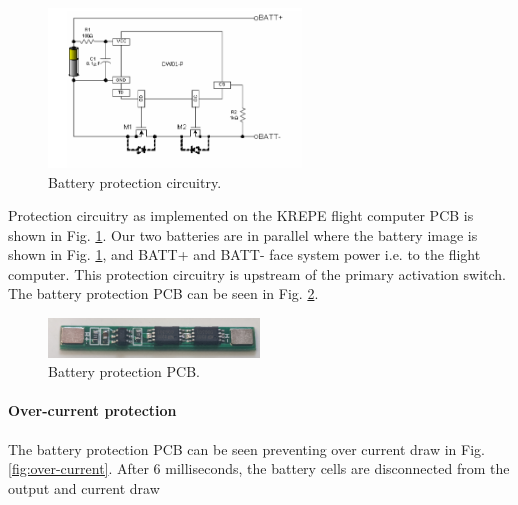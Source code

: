\documentclass{article}
\begin{document}
\begin{figure}[H]
	\centering
	\includegraphics[width=0.6\textwidth]{images/dw108.png}
	\caption{Battery protection circuitry.}
	\label{fig:bat-protec}
\end{figure}



Protection circuitry as implemented on the KREPE flight computer PCB is shown in Fig. \ref{fig:bat-protec}. Our two batteries are in parallel where the battery image is shown in Fig. \ref{fig:bat-protec}, and BATT+ and BATT- face system power i.e. to the flight computer. This protection circuitry is upstream of the primary activation switch. The battery protection PCB can be seen in Fig. \ref{fig:bat-protect}.


\begin{figure}[H]
	\centering
	\includegraphics[width=0.5\textwidth]{images/new_batt_prot.png}
	\caption{Battery protection PCB.}
	\label{fig:bat-protect}
\end{figure}


\paragraph{Over-current protection}
The battery protection PCB can be seen preventing over current draw in Fig. \ref{fig:over-current}. After 6 milliseconds, the battery cells are disconnected from the output and current draw 
\end{document}

